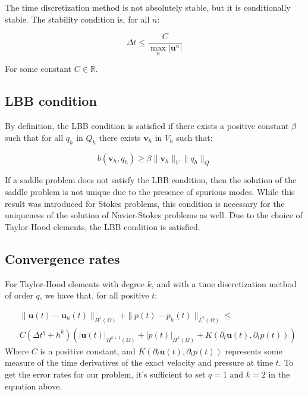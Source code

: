 The time discretization method is not absolutely stable, but it is conditionally stable. The stability condition is, for all $n$:

\begin{equation}
    \Delta t \leq \frac{C}{\max\limits_n |\mathbf{u}^n|}
\end{equation}

For some constant $C \in \mathbb{R}$.

\subsection{LBB condition}
By definition, the LBB condition is satisfied if there exists a positive constant $\beta$ such that for all $q_h$ in $Q_h$ there exists $\mathbf{v}_h$ in $V_h$ such that:

\begin{equation}
    b(\mathbf{v}_h, q_h) \geq \beta \|\mathbf{v}_h\|_V \|q_h\|_Q
\end{equation}

If a saddle problem does not satisfy the LBB condition, then the solution of the saddle problem is not unique due to the presence of spurious modes. While this result was introduced for Stokes problems, this condition is necessary for the uniqueness of the solution of Navier-Stokes problems as well. Due to the choice of Taylor-Hood elements, the LBB condition is satisfied.

\subsection{Convergence rates}
For Taylor-Hood elements with degree $k$, and with a time discretization method of order $q$, we have that, for all positive $t$:

\begin{equation}
    \begin{split}
        & \|\mathbf{u}(t) - \mathbf{u}_h(t)\|_{H^1(\Omega)} + \|p(t) - p_h(t)\|_{L^2(\Omega)} \leq \\
        & C (\Delta t^q + h^k)(|\mathbf{u}(t)|_{H^{k+1}(\Omega)} + |p(t)|_{H^k(\Omega)} + K(\partial_t \mathbf{u}(t), \partial_t p(t)))
    \end{split}
\end{equation}
Where $C$ is a positive constant, and $K(\partial_t \mathbf{u}(t), \partial_t p(t))$ represents some measure of the time derivatives of the exact velocity and pressure at time $t$. To get the error rates for our problem, it's sufficient to set $q=1$ and $k=2$ in the equation above.


